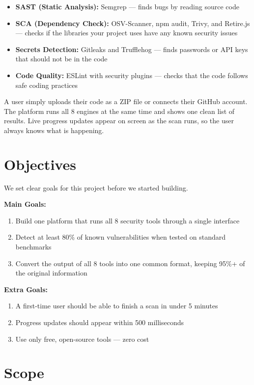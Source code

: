 \documentclass[12pt,a4paper]{report}
\begin{document}
\begin{itemize}
    \item \textbf{SAST (Static Analysis):} Semgrep --- finds bugs by reading source code
    \item \textbf{SCA (Dependency Check):} OSV-Scanner, npm audit, Trivy, and Retire.js --- checks if the libraries your project uses have any known security issues
    \item \textbf{Secrets Detection:} Gitleaks and Trufflehog --- finds passwords or API keys that should not be in the code
    \item \textbf{Code Quality:} ESLint with security plugins --- checks that the code follows safe coding practices
\end{itemize}

A user simply uploads their code as a ZIP file or connects their GitHub account. The platform runs all 8 engines at the same time and shows one clean list of results. Live progress updates appear on screen as the scan runs, so the user always knows what is happening.

\section{Objectives}

We set clear goals for this project before we started building.

\textbf{Main Goals:}
\begin{enumerate}
    \item Build one platform that runs all 8 security tools through a single interface
    \item Detect at least 80\% of known vulnerabilities when tested on standard benchmarks
    \item Convert the output of all 8 tools into one common format, keeping 95\%+ of the original information
\end{enumerate}

\textbf{Extra Goals:}
\begin{enumerate}
    \item A first-time user should be able to finish a scan in under 5 minutes
    \item Progress updates should appear within 500 milliseconds
    \item Use only free, open-source tools --- zero cost
\end{enumerate}

\section{Scope}
\end{document}
